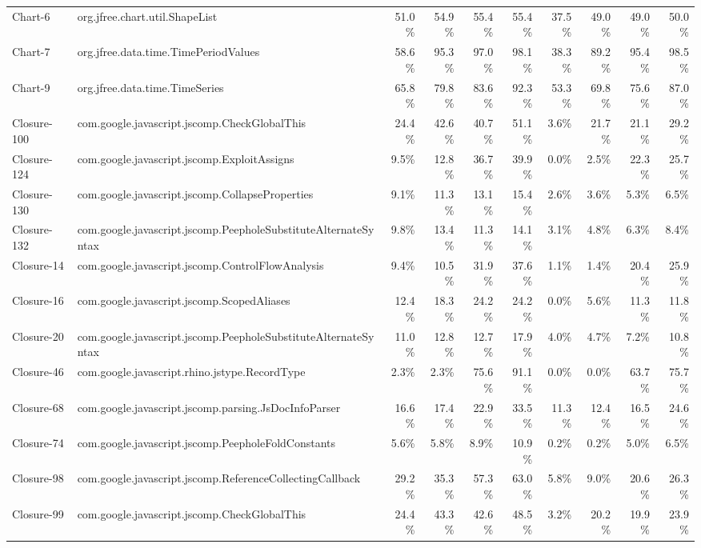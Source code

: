 \begin{tabular}{ ll rrrr rrrr}
Chart-6 &  org.jfree.chart.util.ShapeList &  51.0\% &  54.9\% &  55.4\% &  55.4\% &  37.5\% &  49.0\% &  49.0\% &  50.0\%\\ 
Chart-7 &  org.jfree.data.time.TimePeriodValues &  58.6\% &  95.3\% &  97.0\% &  98.1\% &  38.3\% &  89.2\% &  95.4\% &  98.5\%\\ 
Chart-9 &  org.jfree.data.time.TimeSeries &  65.8\% &  79.8\% &  83.6\% &  92.3\% &  53.3\% &  69.8\% &  75.6\% &  87.0\%\\ 
Closure-100 &  com.google.javascript.jscomp.CheckGlobalThis &  24.4\% &  42.6\% &  40.7\% &  51.1\% &  3.6\% &  21.7\% &  21.1\% &  29.2\%\\ 
Closure-124 &  com.google.javascript.jscomp.ExploitAssigns &  9.5\% &  12.8\% &  36.7\% &  39.9\% &  0.0\% &  2.5\% &  22.3\% &  25.7\%\\ 
Closure-130 &  com.google.javascript.jscomp.CollapseProperties &  9.1\% &  11.3\% &  13.1\% &  15.4\% &  2.6\% &  3.6\% &  5.3\% &  6.5\%\\ 
Closure-132 &  com.google.javascript.jscomp.PeepholeSubstituteAlternateSyntax &  9.8\% &  13.4\% &  11.3\% &  14.1\% &  3.1\% &  4.8\% &  6.3\% &  8.4\%\\ 
Closure-14 &  com.google.javascript.jscomp.ControlFlowAnalysis &  9.4\% &  10.5\% &  31.9\% &  37.6\% &  1.1\% &  1.4\% &  20.4\% &  25.9\%\\ 
Closure-16 &  com.google.javascript.jscomp.ScopedAliases &  12.4\% &  18.3\% &  24.2\% &  24.2\% &  0.0\% &  5.6\% &  11.3\% &  11.8\%\\ 
Closure-20 &  com.google.javascript.jscomp.PeepholeSubstituteAlternateSyntax &  11.0\% &  12.8\% &  12.7\% &  17.9\% &  4.0\% &  4.7\% &  7.2\% &  10.8\%\\ 
Closure-46 &  com.google.javascript.rhino.jstype.RecordType &  2.3\% &  2.3\% &  75.6\% &  91.1\% &  0.0\% &  0.0\% &  63.7\% &  75.7\%\\ 
Closure-68 &  com.google.javascript.jscomp.parsing.JsDocInfoParser &  16.6\% &  17.4\% &  22.9\% &  33.5\% &  11.3\% &  12.4\% &  16.5\% &  24.6\%\\ 
Closure-74 &  com.google.javascript.jscomp.PeepholeFoldConstants &  5.6\% &  5.8\% &  8.9\% &  10.9\% &  0.2\% &  0.2\% &  5.0\% &  6.5\%\\ 
Closure-98 &  com.google.javascript.jscomp.ReferenceCollectingCallback &  29.2\% &  35.3\% &  57.3\% &  63.0\% &  5.8\% &  9.0\% &  20.6\% &  26.3\%\\ 
Closure-99 &  com.google.javascript.jscomp.CheckGlobalThis &  24.4\% &  43.3\% &  42.6\% &  48.5\% &  3.2\% &  20.2\% &  19.9\% &  23.9\%\\ 

\end{tabular}
